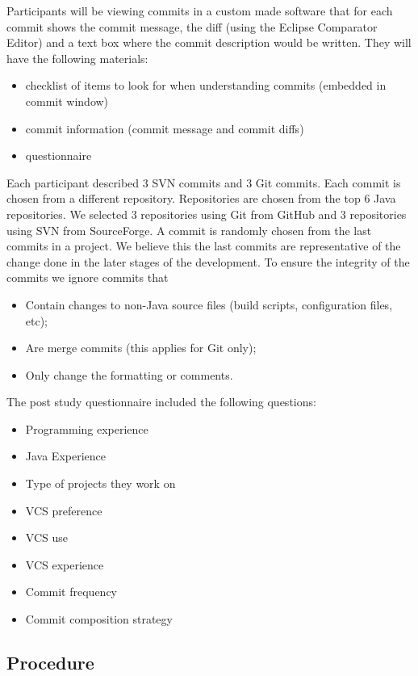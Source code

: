 \documentclass[letterpaper]{article}
\begin{document}
Participants will be viewing commits in a custom made software that for each commit shows the commit message, the diff (using the Eclipse Comparator Editor) and a text box where the commit description would be written.
They will have the following materials:
\begin{itemize}
	\item checklist of items to look for when understanding commits (embedded in commit window)
	\item commit information (commit message and commit diffs)
	\item questionnaire
\end {itemize}

Each participant described 3 SVN commits and 3 Git commits.
Each commit is chosen from a different repository.
Repositories are chosen from the top 6 Java repositories.
We selected 3 repositories using Git from GitHub and 3 repositories using SVN from SourceForge.
A commit is randomly chosen from the last commits in a project.
We believe this the last commits are representative of the change done in the later stages of the development.
To ensure the integrity of the commits we ignore commits that 
\begin{itemize}
	\item Contain changes to non-Java source files (build scripts, configuration files, etc);
	\item Are merge commits (this applies for Git only);
	\item Only change the formatting or comments.
\end{itemize}

The post study questionnaire included the following questions: 
\begin{itemize}
	\item{Programming experience}
	\item{Java Experience}
	\item{Type of projects they work on}
	\item{VCS preference}
	\item{VCS use}
	\item{VCS experience}
	\item{Commit frequency}
	\item{Commit composition strategy}
\end{itemize}

\subsection{Procedure}
\end{document}
